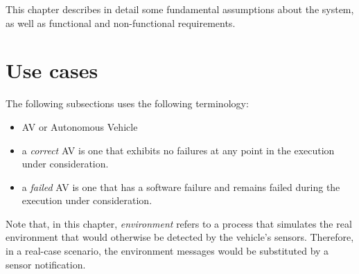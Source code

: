 \documentclass{memoir}
\begin{document}
This chapter describes in detail some fundamental assumptions about the system, as well as functional and non-functional requirements.

\section{Use cases}

The following subsections uses the following terminology:
\begin{itemize}
	\item AV or Autonomous Vehicle
	\item  a \emph{correct} AV is one that exhibits no failures at any
point in the execution under consideration.
	\item a \emph{failed} AV is one that has a software failure and remains failed during the execution under consideration.
\end{itemize}

Note that, in this chapter, \emph{environment} refers to a process that simulates the real environment that would otherwise be detected by the vehicle's sensors. Therefore, in a real-case scenario, the environment messages would be substituted by a sensor notification.
\end{document}
